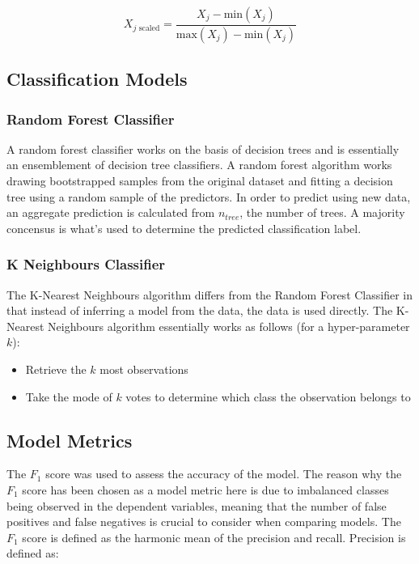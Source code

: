 \documentclass[a4paper,11pt]{article}
\begin{document}
\begin{equation}
	X_{j \text{ scaled}} = \frac{X_{j}-\text{min}(X_{j})}{\text{max}(X_{j})-\text{min}(X_{j})}
\end{equation}

\subsection{Classification Models}

\subsubsection{Random Forest Classifier}

A random forest classifier works on the basis of decision trees and is essentially an ensemblement of decision tree classifiers. A random forest algorithm works drawing bootstrapped samples from the original dataset and fitting a decision tree using a random sample of the predictors. In order to predict using new data, an aggregate prediction is calculated from $n_{tree}$, the number of trees. A majority concensus is what's used to determine the predicted classification label.

\subsubsection{K Neighbours Classifier}

The K-Nearest Neighbours algorithm differs from the Random Forest Classifier in that instead of inferring a model from the data, the data is used directly. The K-Nearest Neighbours algorithm essentially works as follows (for a hyper-parameter $k$):

\begin{itemize}
	\item Retrieve the $k$ most observations
	\item Take the mode of $k$ votes to determine which class the observation belongs to
\end{itemize}

\subsection{Model Metrics}

The $F_{1}$ score was used to assess the accuracy of the model. The reason why the $F_{1}$ score has been chosen as a model metric here is due to imbalanced classes being observed in the dependent variables, meaning that the number of false positives and false negatives is crucial to consider when comparing models. The $F_{1}$ score is defined as the harmonic mean of the precision and recall. Precision is defined as:
\end{document}
